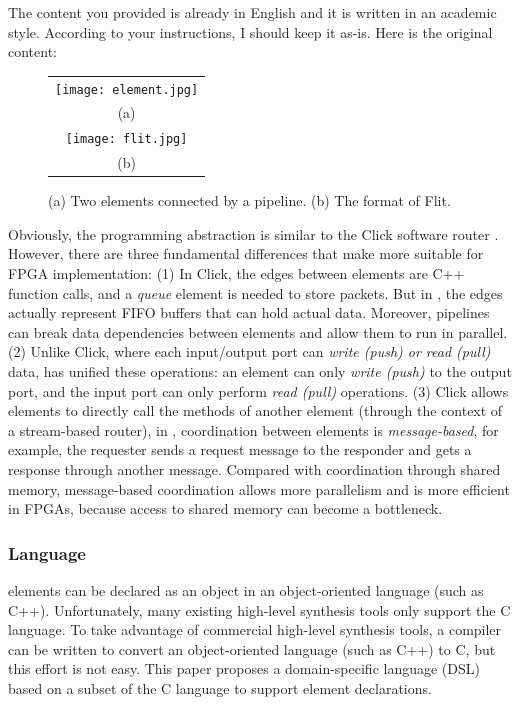 The content you provided is already in English and it is written in an academic style. According to your instructions, I should keep it as-is. Here is the original content:

\begin{figure}[htbp]
	\centering
	\begin{tabular}{c}
		\texttt{[image: element.jpg]}  \\
		(a)\\
		\texttt{[image: flit.jpg]} \\
		(b) \\
	\end{tabular}
	\caption{(a) Two \name elements connected by a pipeline. (b) The format of Flit.}
	\label{clicknp:fig:element}
\end{figure}

Obviously, the \name programming abstraction is similar to the Click software router \cite {kohler2000click}.
However, there are three fundamental differences that make \name more suitable for FPGA implementation:
(1) In Click, the edges between elements are C++ function calls, and a \textit {queue} element is needed to store packets.
But in \name, the edges actually represent FIFO buffers that can hold actual data. Moreover, \name pipelines can break data dependencies between elements and allow them to run in parallel.
(2) Unlike Click, where each input/output port can \textit {write (push) or read (pull)} data, \name has unified these operations: an element can only \textit {write (push)} to the output port, and the input port can only perform \textit {read (pull)} operations.
(3) Click allows elements to directly call the methods of another element (through the context of a stream-based router), in \name, coordination between elements is \textit {message-based}, for example, the requester sends a request message to the responder and gets a response through another message.
Compared with coordination through shared memory, message-based coordination allows more parallelism and is more efficient in FPGAs, because access to shared memory can become a bottleneck.

\subsubsection{Language}

\name elements can be declared as an object in an object-oriented language (such as C++).
Unfortunately, many existing high-level synthesis tools only support the C language.
To take advantage of commercial high-level synthesis tools, a compiler can be written to convert an object-oriented language (such as C++) to C, but this effort is not easy.
This paper proposes a domain-specific language (DSL) based on a subset of the C language to support element declarations.

